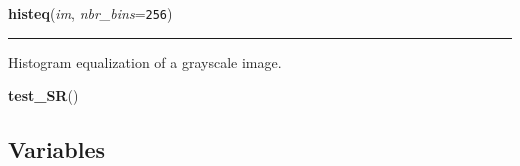     \label{CsTransform:pynufft:histeq}

    \vspace{0.5ex}

\hspace{.8\funcindent}\begin{boxedminipage}{\funcwidth}

    \raggedright \textbf{histeq}(\textit{im}, \textit{nbr\_bins}={\tt 256})

    \vspace{-1.5ex}

    \rule{\textwidth}{0.5\fboxrule}
\setlength{\parskip}{2ex}
    Histogram equalization of a grayscale image.

\setlength{\parskip}{1ex}
    \end{boxedminipage}

    \label{CsTransform:pynufft:test_SR}

    \vspace{0.5ex}

\hspace{.8\funcindent}\begin{boxedminipage}{\funcwidth}

    \raggedright \textbf{test\_SR}()

\setlength{\parskip}{2ex}
\setlength{\parskip}{1ex}
    \end{boxedminipage}



  \subsection{Variables}

